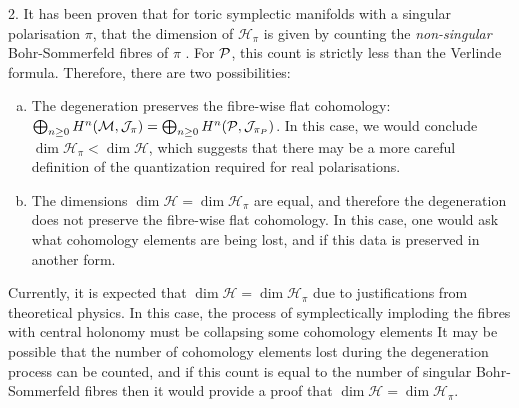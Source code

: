 2. It has been proven that for toric symplectic manifolds with a singular polarisation $\pi$, that the dimension of $\mathcal{H}_\pi$ is given by counting the \emph{non-singular} Bohr-Sommerfeld fibres of $\pi$ \cite{hamilton_locally_2010}. For $\mathcal{P}$, this count is strictly less than the Verlinde formula. Therefore, there are two possibilities:
\begin{enumerate}[(a)]
	\item The degeneration preserves the fibre-wise flat cohomology: $\bigoplus_{n\geq 0}H^n(\mathcal{M},\mathcal{J}_\pi) = \bigoplus_{n\geq 0}H^n(\mathcal{P},\mathcal{J}_{\pi_P})$. In this case, we would conclude $\dim \mathcal{H}_\pi < \dim \mathcal{H}$, which suggests that there may be a more careful definition of the quantization required for real polarisations.
	\item The dimensions $\dim \mathcal{H} = \dim\mathcal{H}_\pi$ are equal, and therefore the degeneration does not preserve the fibre-wise flat cohomology. In this case, one would ask what cohomology elements are being lost, and if this data is preserved in another form.
\end{enumerate}
Currently, it is expected that $\dim \mathcal{H} = \dim\mathcal{H}_\pi$ due to justifications from theoretical physics. In this case, the process of symplectically imploding the fibres with central holonomy must be collapsing some cohomology elements It may be possible that the number of cohomology elements lost during the degeneration process can be counted, and if this count is equal to the number of singular Bohr-Sommerfeld fibres then it would provide a proof that $\dim\mathcal{H} = \dim\mathcal{H}_\pi$.